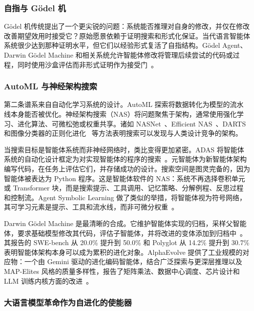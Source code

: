 \subsubsection{自指与 G\"{o}del 机}

G\"{o}del 机传统提出了一个更尖锐的问题：系统能否推理对自身的修改，并仅在修改改善期望效用时接受它？原始愿景依赖于证明搜索和形式化保证。当代语言智能体系统很少达到那种证明水平，但它们以经验形式复活了自指结构。G\"{o}del Agent、Darwin G\"{o}del Machine 和相关系统允许智能体修改将管理后续尝试的代码或过程，同时使用沙盒评估而非形式证明作为接受门~\citep{darwingodelmachine2025}。

\subsubsection{AutoML 与神经架构搜索}

第二条谱系来自自动化学习系统的设计。AutoML 探索将数据转化为模型的流水线本身能否被优化。神经架构搜索（NAS）将问题聚焦于架构，通常使用强化学习、进化算法、可微松弛或权重共享。诸如 NASNet~\citep{zoph2018learning}、Efficient NAS~\citep{pham2018efficient}、DARTS~\citep{liu2018darts} 和图像分类器的正则化进化~\citep{real2019regularized} 等方法表明搜索可以发现与人类设计竞争的架构。

当搜索目标是智能体系统而非神经网络时，类比变得更加紧密。ADAS 将智能体系统的自动化设计框定为对实现智能体的程序的搜索~\citep{adas2025}。元智能体为新智能体架构编写代码，在任务上评估它们，并存储成功的设计。搜索空间是图灵完备的，因为智能体被表达为 Python 程序。这是智能体软件的 NAS：系统不再选择卷积单元或 Transformer 块，而是搜索提示、工具调用、记忆策略、分解例程、反思过程和控制流。Agent Symbolic Learning 做了类似的举措，将智能体视为符号网络，其可学习元素是提示、工具和流水线，而非可微分权重~\citep{agentsymboliclearning2024}。

Darwin G\"{o}del Machine 是最清晰的合成。它维护智能体实现的归档，采样父智能体，要求基础模型修改其代码，评估子智能体，并将改进的变体添加到归档中~\citep{darwingodelmachine2025}。其报告的 SWE-bench 从 20.0\% 提升到 50.0\% 和 Polyglot 从 14.2\% 提升到 30.7\% 表明智能体架构本身可以成为累积的进化对象。AlphaEvolve 提供了工业规模的对应物：一个由 Gemini 驱动的进化编码智能体，结合广泛探索与更深层推理以及 MAP-Elites 风格的质量多样性，报告了矩阵乘法、数据中心调度、芯片设计和 LLM 训练内核方面的改进~\citep{alphaevolve2025}。

\subsubsection{大语言模型革命作为自进化的使能器}

